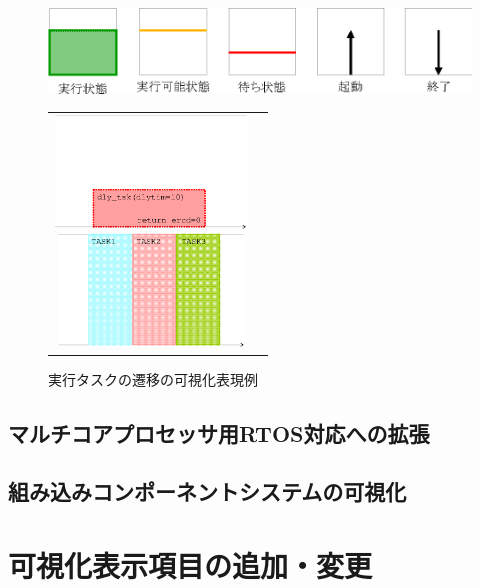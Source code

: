 \begin{figure}[t]
\begin{center}
\includegraphics[scale=0.75]{img/taskStateChangeVisual.eps}
\caption{タスクの状態遷移の可視化表現例}
\label{fig:taskStateChangeVisual}
\end{center}
\begin{tabular}{cc}
\begin{minipage}{0.5\hsize}
\begin{center}
\includegraphics[height=3cm]{img/svcCallVisual.eps}
\caption{システムコールの可視化表現例}
\label{fig:svcCallVisual}
\end{center}
\end{minipage}
\begin{minipage}{0.5\hsize}
\begin{center}
\includegraphics[height=3cm]{img/runningTaskChangeVisual.eps}
\caption{実行タスクの遷移の可視化表現例}
\label{fig:runningTaskChangeVisual}
\end{center}
\end{minipage}
\end{tabular}
\end{figure}






\subsection{マルチコアプロセッサ用RTOS対応への拡張}

\subsection{組み込みコンポーネントシステムの可視化}

\section{可視化表示項目の追加・変更}
